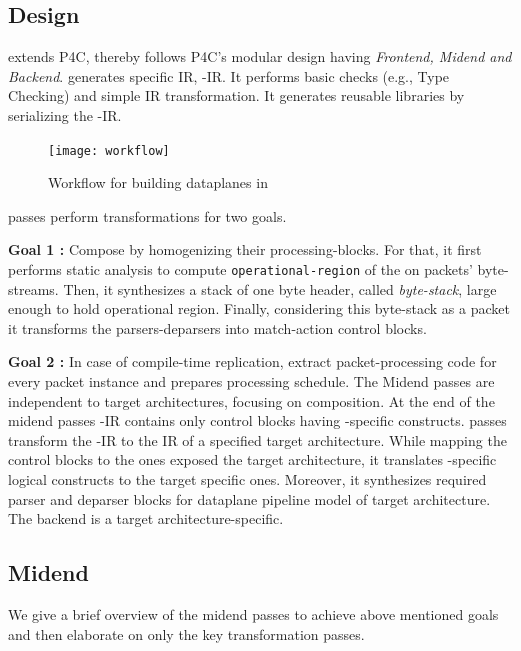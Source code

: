 \documentclass[letterpaper,twocolumn,10pt]{article}
\begin{document}
\subsection{Design}
\ucomp extends P4C, thereby follows P4C's modular design having 
\emph{Frontend, Midend and Backend}. 
 generates \ucomp specific IR, \ucomp-IR. It 
performs basic checks (e.g., Type Checking) and simple IR 
transformation. It generates reusable libraries by serializing the 
\ucomp-IR.
\begin{figure}[tbh]
  \centering
  \texttt{[image: workflow]}
  \caption{Workflow for building dataplanes in \ulang}
  \label{fig:workflow}
\end{figure}
 passes perform transformations for two goals. \par
\textbf{Goal 1 :} Compose \uprograms by homogenizing their 
processing-blocks. For that, it first performs static analysis to 
compute \texttt{operational-region} of the \uprogram on packets' 
byte-streams.
Then, it synthesizes a stack of one byte header, called 
\emph{byte-stack}, large enough to hold operational region. 
Finally, considering this byte-stack as a packet it transforms the 
parsers-deparsers into match-action control blocks. \par
\textbf{Goal 2 :} In case of compile-time replication, extract 
packet-processing code for every packet instance and prepares 
processing schedule. The Midend passes are independent to target 
architectures, focusing on composition. At the end of the midend 
passes \ucomp-IR contains only control blocks having \uarch-specific 
constructs. 
 passes transform the \ucomp-IR to the IR of a 
specified target architecture. While mapping the control blocks to 
the ones exposed the target architecture, it translates 
\uarch-specific logical constructs to the target specific 
ones. Moreover, it synthesizes required parser and deparser blocks 
for dataplane pipeline model of target architecture. The backend is a 
target architecture-specific.



\subsection{\ucomp Midend}
We give a brief overview of the midend passes to achieve above 
mentioned goals and then elaborate on only the key transformation 
passes.
\end{document}
